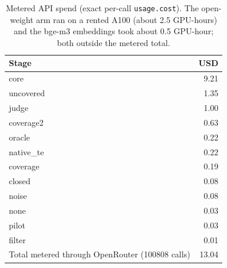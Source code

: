 \begin{table}[h]\centering\small
\begin{tabular}{lr}
\toprule
Stage & USD \\
\midrule
core & 9.21 \\
uncovered & 1.35 \\
judge & 1.00 \\
coverage2 & 0.63 \\
oracle & 0.22 \\
native\_te & 0.22 \\
coverage & 0.19 \\
closed & 0.08 \\
noise & 0.08 \\
none & 0.03 \\
pilot & 0.03 \\
filter & 0.01 \\
\midrule
Total metered through OpenRouter (100808 calls) & 13.04 \\
\bottomrule
\end{tabular}
\caption{Metered API spend (exact per-call \texttt{usage.cost}). The open-weight arm ran on a rented A100 (about 2.5 GPU-hours) and the bge-m3 embeddings took about 0.5 GPU-hour; both outside the metered total.}
\label{tab:cost}
\end{table}